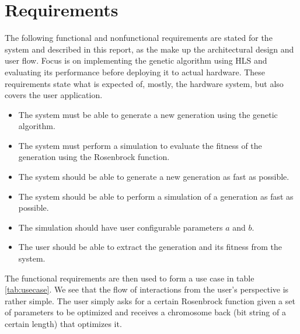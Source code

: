 \section{Requirements}\label{sec:req}

The following functional and nonfunctional requirements are stated for the system and described in this report, as the make up the architectural design and user flow. Focus is on implementing the genetic algorithm using HLS and evaluating its performance before deploying it to actual hardware. These requirements state what is expected of, mostly, the hardware system, but also covers the user application.

\begin{itemize}
\item The system must be able to generate a new generation using the genetic algorithm.
\item The system must perform a simulation to evaluate the fitness of the generation using the Rosenbrock function.
\item The system should be able to generate a new generation as fast as possible.
\item The system should be able to perform a simulation of a generation as fast as possible.
\item The simulation should have user configurable parameters $a$ and $b$.
\item The user should be able to extract the generation and its fitness from the system.
\end{itemize}

The functional requirements are then used to form a use case in table \ref{tab:usecase}. We see that the flow of interactions from the user's perspective is rather simple. The user simply asks for a certain Rosenbrock function given a set of parameters to be optimized and receives a chromosome back (bit string of a certain length) that optimizes it.


